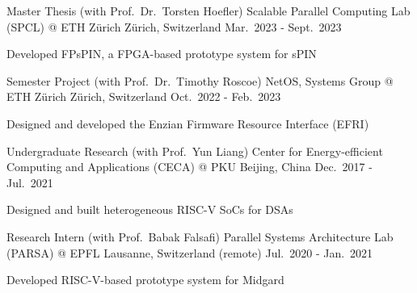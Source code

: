 

\begin{cventries}

  \cventry
    {Master Thesis (with Prof.\ Dr.\ Torsten Hoefler)} %
    {Scalable Parallel Computing Lab (SPCL) @ ETH Z\"urich} %
    {Z\"urich, Switzerland} %
    {Mar.\ 2023 - Sept.\ 2023} %
    {
      \begin{cvitems} %
        \item {Developed FPsPIN, a FPGA-based prototype system for sPIN}
      \end{cvitems}
    }

  \cventry
    {Semester Project (with Prof.\ Dr.\ Timothy Roscoe)} %
    {NetOS, Systems Group @ ETH Z\"urich} %
    {Z\"urich, Switzerland} %
    {Oct.\ 2022 - Feb.\ 2023} %
    {
      \begin{cvitems} %
        \item {Designed and developed the Enzian Firmware Resource Interface (EFRI)}
      \end{cvitems}
    }

  \cventry
    {Undergraduate Research (with Prof.\ Yun Liang)} %
    {Center for Energy-efficient Computing and Applications (CECA) @ PKU} %
    {Beijing, China} %
    {Dec.\ 2017 - Jul.\ 2021} %
    {
      \begin{cvitems} %
        \item {Designed and built heterogeneous RISC-V SoCs for DSAs}
      \end{cvitems}
    }

  \cventry
    {Research Intern (with Prof.\ Babak Falsafi)} %
    {Parallel Systems Architecture Lab (PARSA) @ EPFL} %
    {Lausanne, Switzerland (remote)} %
    {Jul.\ 2020 - Jan.\ 2021} %
    {
      \begin{cvitems} %
        \item {Developed RISC-V-based prototype system for Midgard}
      \end{cvitems}
    }


\end{cventries}
